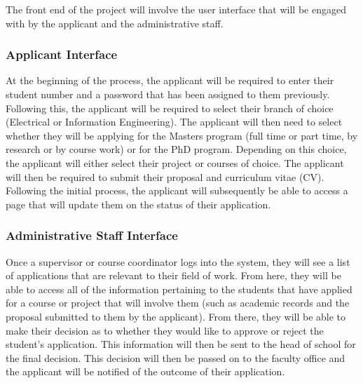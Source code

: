 \documentclass[journal,comsoc]{IEEEtran}
\begin{document}
The front end of the project will involve the user interface that will be engaged with by the applicant and the administrative staff. \vspace{2mm}


\subsubsection{Applicant Interface}

\hfill \break At the beginning of the process, the applicant will be required to enter their student number and a password that has been assigned to them previously. Following this, the applicant will be required to select their branch of choice (Electrical or Information Engineering). The applicant will then need to select whether they will be applying for the Masters program (full time or part time, by research or by course work) or for the PhD program. Depending on this choice, the applicant will either select their project or courses of choice. The applicant will then be required to submit their proposal and curriculum vitae (CV). Following the initial process, the applicant will subsequently be able to access a page that will update them on the status of their application. \vspace{2mm}


\subsubsection{Administrative Staff Interface}

\hfill \break Once a supervisor or course coordinator logs into the system, they will see a list of applications that are relevant to their field of work. From here, they will be able to access all of the information pertaining to the students that have applied for a course or project that will involve them (such as academic records and the proposal submitted to them by the applicant). From there, they will be able to make their decision as to whether they would like to approve or reject the student's application. This information will then be sent to the head of school for the final decision. This decision will then be passed on to the faculty office and the applicant will be notified of the outcome of their application.
\end{document}
